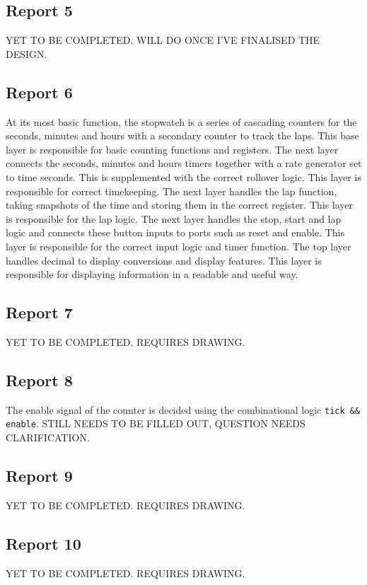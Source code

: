 \documentclass{report}
\begin{document}
\subsection{Report 5}
YET TO BE COMPLETED. WILL DO ONCE I'VE FINALISED THE DESIGN.

\subsection{Report 6}
At its most basic function, the stopwatch is a series of cascading counters for the seconds, 
minutes and hours with a secondary counter to track the laps. This base layer 
is responsible for basic counting functions and registers. 
\break
The next layer connects the seconds, minutes and hours timers together with a 
rate generator set to time seconds. This is supplemented with the correct rollover logic.
 This layer is responsible for correct timekeeping.
\break
The next layer handles the lap function, taking snapshots of the time and storing them in 
the correct register. This layer is responsible for the lap logic.
\break
The next layer handles the stop, start and lap logic and connects these button inputs 
to ports such as reset and enable. This layer is responsible for the correct 
input logic and timer function. 
\break
The top layer handles decimal to display conversions and display features. This 
layer is responsible for displaying information in a readable and useful way.

\subsection{Report 7}
YET TO BE COMPLETED. REQUIRES DRAWING.

\subsection{Report 8}
The enable signal of the counter is decided using the combinational logic 
\verb|tick && enable|. STILL NEEDS TO BE FILLED OUT, QUESTION NEEDS 
CLARIFICATION.

\subsection{Report 9}
YET TO BE COMPLETED. REQUIRES DRAWING.

\subsection{Report 10}
YET TO BE COMPLETED. REQUIRES DRAWING.
\end{document}
